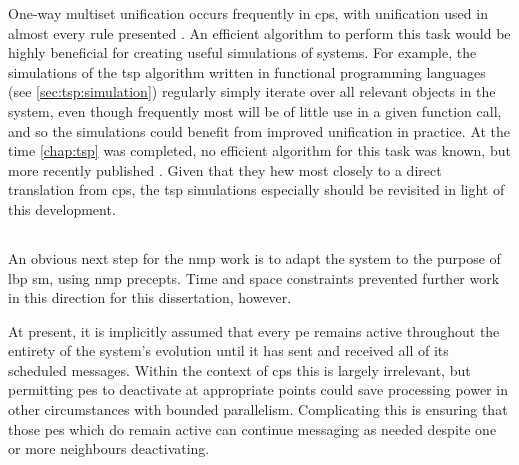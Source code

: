 One-way multiset unification occurs frequently in \gls{cps}, with unification used in almost every rule presented .  An efficient algorithm to perform this task would be highly beneficial for creating useful simulations of systems.  For example, the simulations of the \gls{tsp} algorithm written in functional programming languages (see \vref{sec:tsp:simulation}) regularly simply iterate over all relevant objects in the system, even though frequently most will be of little use in a given function call, and so the simulations could benefit from improved unification in practice.  At the time \cref{chap:tsp} was completed, no efficient algorithm for this task was known, but more recently \citeauthor{Liu2021} published  \cite{Liu2021}.  Given that they hew most closely to a direct translation from \gls{cps}, the \gls{tsp} simulations especially should be revisited in light of this development.



\subsection{}
An obvious next step for the \gls{nmp} work is to adapt the system to the purpose of \gls{lbp} \gls{sm}, using \gls{nmp} precepts.  Time and space constraints prevented further work in this direction for this dissertation, however.%

At present, it is implicitly assumed that every \gls{pe} remains active throughout the entirety of the system's evolution until it has sent and received all of its scheduled messages.  Within the context of \gls{cps} this is largely irrelevant, but permitting \glspl{pe} to deactivate at appropriate points could save processing power in other circumstances with bounded parallelism.  Complicating this is ensuring that those \glspl{pe} which do remain active can continue messaging as needed despite one or more neighbours deactivating.

